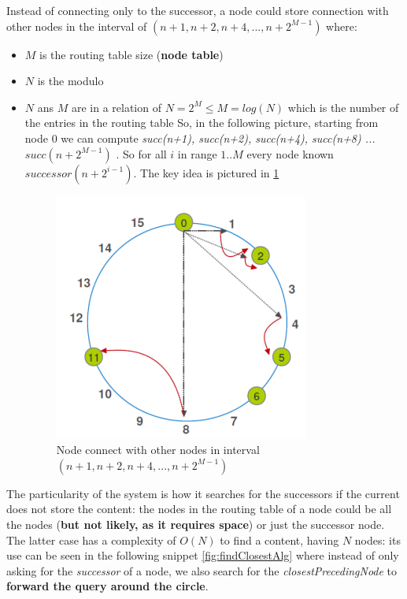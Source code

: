 \documentclass[10pt,a4paper]{report}
\begin{document}
Instead of connecting only to the successor, a node could store connection with other nodes in the interval of $(n+1, n+2, n+4, ..., n+2^{M-1})$ where:
\begin{itemize}
	\item 
	$M$ is the routing table size (\textbf{node table})
	\item 
	$N$ is the modulo
	\item 
	$N$ ans $M$ are in a relation of $N = 2^{M} \leq M = log(N)$ which is the number of the entries in the routing table
	So, in the following picture, starting from node 0 we can compute \textit{succ(n+1), succ(n+2), succ(n+4), succ(n+8) ... }$succ(n+2^{M-1})$ . So for all $i$ in range $1..M$ every node known $successor(n+2^{i-1})$. The key idea is pictured in \ref{ring-successor}
	\begin{figure}
		\centering
		\includegraphics[scale=0.70]{images/Pasted image 20230303115451.png}
		\caption{Node connect with other nodes in interval $(n+1, n+2, n+4, ..., n+2^{M-1})$}
		\label{ring-successor}	
\end{figure}
	
\end{itemize}

The particularity of the system is how it searches for the successors if the current does not store the content: the nodes in the routing table of a node could be all the nodes (\textbf{but not likely, as it requires space}) or just the successor node. The latter case has a complexity of $O(N)$ to find a content, having $N$ nodes: its use can be seen in the following snippet \ref{fig:findClosestAlg} where instead of only asking for the \textit{successor} of a node, we also search for the \textit{closestPrecedingNode} to \textbf{forward the query around the circle}.
\end{document}
